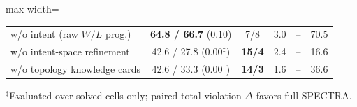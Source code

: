 \begin{table}[t]
\begin{adjustbox}{max width=\columnwidth}
\begin{tabular}{@{}lccccc@{}}
\quad w/o intent (raw $W/L$ prog.) & \textbf{64.8 / 66.7} (0.10) & 7/8 & 3.0 & -- & 70.5 \\
\quad w/o intent-space refinement & 42.6 / 27.8 (0.00$^\ddagger$) & \textbf{15/4} & 2.4 & -- & 16.6 \\
\quad w/o topology knowledge cards & 42.6 / 33.3 (0.00$^\ddagger$) & \textbf{14/3} & 1.6 & -- & 36.6 \\
\bottomrule
\end{tabular}
\end{adjustbox}
\begin{flushleft}\fontsize{6.0}{6.8}\selectfont
$^\ddagger$Evaluated over solved cells only; paired total-violation $\Delta$ favors full \textsc{SPECTRA}.
\end{flushleft}
\end{table}
